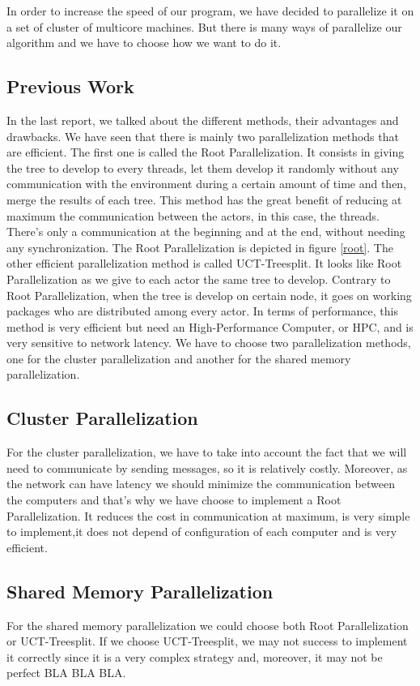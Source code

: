 In order to increase the speed of our program, we have decided to parallelize it on a set of cluster of multicore machines. But there is many ways of parallelize our algorithm and we have to choose how we want to do it. 
\subsection{Previous Work}
In the last report, we talked about the different methods, their advantages and drawbacks. We have seen that there is mainly two parallelization methods that are efficient.
\newline
The first one is called the Root Parallelization. It consists in giving the tree to develop to every threads, let them develop it randomly without any communication with the environment
during a certain amount of time and then, merge the results of each tree.
This method has the great benefit of reducing at maximum the communication between the actors, in this case, the threads.
There's only a communication at the beginning and at the end, without needing any synchronization. The Root Parallelization is depicted in figure \ref{root}.
\newline
The other efficient parallelization method is called UCT-Treesplit. It looks like Root Parallelization as we give to each actor the same tree to develop.
Contrary to Root Parallelization, when the tree is develop on certain node, it goes on working packages who are distributed among every actor.
In terms of performance, this method is very efficient but need an High-Performance Computer, or HPC, and is very sensitive to network latency.
\newline
We have to choose two parallelization methods, one for the cluster parallelization and another for the shared memory parallelization.
\subsection{Cluster Parallelization}
For the cluster parallelization, we have to take into account the fact that we will need to communicate by sending messages, so it is relatively costly.
Moreover, as the network can have latency we should minimize the communication between the computers and that's why we have choose to implement a Root Parallelization.
It reduces the cost in communication at maximum, is very simple to implement,it does not depend of configuration of each computer and is very efficient.
\subsection{Shared Memory Parallelization}
For the shared memory parallelization we could choose both Root Parallelization or UCT-Treesplit.
If we choose UCT-Treesplit, we may not success to implement it correctly since it is a very complex strategy and, moreover, it may not be perfect BLA BLA BLA.
